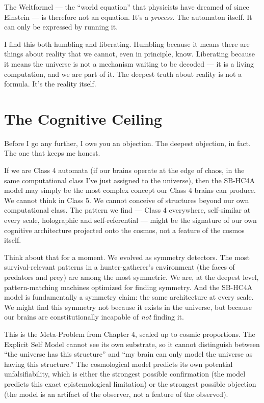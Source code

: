 \documentclass[11pt, twoside, openright]{book}
\begin{document}
The Weltformel --- the ``world equation'' that physicists have dreamed of since Einstein --- is therefore not an equation. It's a \textit{process}. The automaton itself. It can only be expressed by running it.

I find this both humbling and liberating. Humbling because it means there are things about reality that we cannot, even in principle, know. Liberating because it means the universe is not a mechanism waiting to be decoded --- it is a living computation, and we are part of it. The deepest truth about reality is not a formula. It's the reality itself.


\section*{The Cognitive Ceiling}

Before I go any further, I owe you an objection. The deepest objection, in fact. The one that keeps me honest.

If we are Class 4 automata (if our brains operate at the edge of chaos, in the same computational class I've just assigned to the universe), then the SB-HC4A model may simply be the most complex concept our Class 4 brains can produce. We cannot think in Class 5. We cannot conceive of structures beyond our own computational class. The pattern we find --- Class 4 everywhere, self-similar at every scale, holographic and self-referential --- might be the signature of our own cognitive architecture projected onto the cosmos, not a feature of the cosmos itself.

Think about that for a moment. We evolved as symmetry detectors. The most survival-relevant patterns in a hunter-gatherer's environment (the faces of predators and prey) are among the most symmetric. We are, at the deepest level, pattern-matching machines optimized for finding symmetry. And the SB-HC4A model is fundamentally a symmetry claim: the same architecture at every scale. We might find this symmetry not because it exists in the universe, but because our brains are constitutionally incapable of \textit{not} finding it.

This is the Meta-Problem from Chapter 4, scaled up to cosmic proportions. The Explicit Self Model cannot see its own substrate, so it cannot distinguish between ``the universe has this structure'' and ``my brain can only model the universe as having this structure.'' The cosmological model predicts its own potential unfalsifiability, which is either the strongest possible confirmation (the model predicts this exact epistemological limitation) or the strongest possible objection (the model is an artifact of the observer, not a feature of the observed).
\end{document}
